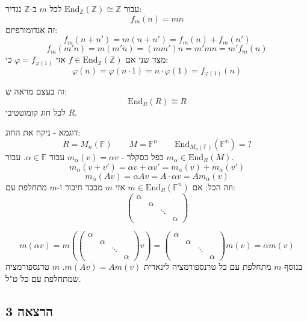 \documentclass{tstextbook}
\begin{document}
\begin{example}
עבור \(\mathrm{End}_{\mathbb{Z}}(\mathbb{Z})\cong \mathbb{Z}\) לכל \(m\) ב-\(\mathbb{Z}\) נגדיר:
$$f_{m}(n)=mn$$
זה אנדומורפיזם:
$$f_{m}(n+n')=m(n+n')=f_{m}(n)+f_{m}(n')$$$$f_{m}(m'n)=m(m'n)=(mm')n=m'mn=m'f_{m}(n)$$
מצד שני אם \(f \in \mathrm{End}_{\mathbb{Z}}(\mathbb{Z})\) אזי \(\varphi=f_{\varphi(1)}\) כי:
$$\varphi(n)=\varphi(n\cdot 1)=n\cdot \varphi( 1)=f_{\varphi(1)}(n)$$

\end{example}
זה בעצם מראה ש:
$$\mathrm{End}_{R}(R)\cong  R$$
לכל חוג קומוטטיבי \(R\). 

דוגמא - ניקח את החוג:
$$R=M_{n}(\mathbb{F} )\qquad M=\mathbb{F} ^{n}\qquad \mathrm{End}_{M_{n}(\mathbb{F} )}(\mathbb{F^{n}} )=?$$
כפל בסקלר - \(m_{\alpha}(v)=\alpha v\) עבור \(\alpha \in \mathbb{F}\). עבור \(m_{\alpha}\in \mathrm{End}_{R}(M)\).
$$m_{\alpha}(v+v')=\alpha v+\alpha v'=m_{\alpha}(v)+m_{\alpha}(v')$$$$m_{\alpha}(Av)=\alpha Av=A\cdot \alpha v=Am_{\alpha}(v)$$
וזה הכל: אם \(m \in \mathrm{End}_{R}(\mathbb{F}^{n})\) אזי \(m\) מכבד חיבור ו-\(m\) מתחלפת עם:
$$\begin{pmatrix}\alpha &  &  &      \\ & \alpha &  &      \\ &  &   \ddots &    \\ &  &    & \alpha   
\end{pmatrix}$$

$$m(\alpha v)=m(\begin{pmatrix}\alpha &  &  &      \\ & \alpha &  &      \\ &  &   \ddots &    \\ &  &    & \alpha   \end{pmatrix}v)=\begin{pmatrix}\alpha &  &  &      \\ & \alpha &  &      \\ &  &   \ddots &    \\ &  &    & \alpha   
\end{pmatrix}m(v)=\alpha m(v)$$
בנוסף \(m\) מתחלפת עם כל טרנספורמציה לינארית \(m(Av)=Am(v)\). \(m\) טרנספורמציה שמתחלפת עם כל ט"ל.

\subsection{הרצאה 3}
\end{document}
